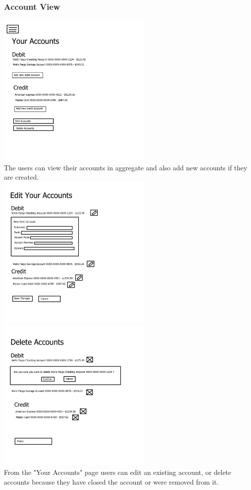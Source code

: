 \documentclass[12pt]{article}
\begin{document}
\subsubsection{Account View}
\includegraphics[width=3in]{your_accounts_page.jpg}\\
The users can view their accounts in aggregate and also add new accounts if they are created.\\
\includegraphics[width=3in]{edit_your_accounts_page.jpg}
\includegraphics[width=3in]{delete_accounts_page.jpg}\\
From the "Your Accounts" page users can edit an existing account, or delete accounts because they have closed the account or were removed from it.\\
\end{document}
